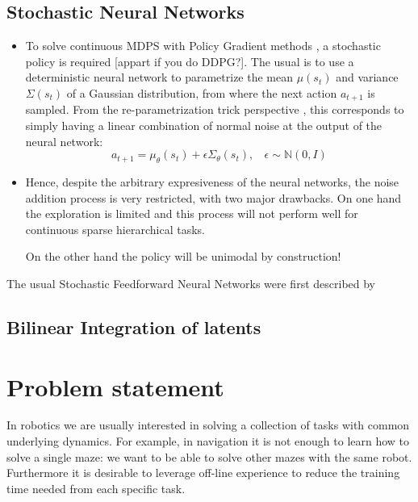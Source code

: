 \documentclass{article} %
\begin{document}
\subsection{Stochastic Neural Networks}

\begin{itemize}
    \item To solve continuous MDPS with Policy Gradient methods \citep{peters2008reinforcement}, a stochastic policy is required [appart if you do DDPG?]. The usual is to use a deterministic neural network to parametrize the mean $\mu(s_t)$ and variance $\Sigma(s_t)$ of a Gaussian distribution, from where the next action $a_{t+1}$ is sampled. From the re-parametrization trick perspective \citep{look at SVG paper or DeepMind-modulate}, this corresponds to simply having a linear combination of normal noise at the output of the neural network:
    \begin{equation}
        a_{t+1} = \mu_{\theta}(s_t) +\epsilon \Sigma_\theta(s_t), ~~~~ \epsilon \sim \mathbb{N}(0,I)
    \end{equation}
    \item Hence, despite the arbitrary expresiveness of the neural networks, the noise addition process is very restricted, with two major drawbacks. On one hand the exploration is limited and this process will not perform well for continuous sparse hierarchical tasks. 
    
    On the other hand the policy will be unimodal by construction!
\end{itemize}
The usual Stochastic Feedforward Neural Networks were first described by \citet{tang2013sfnn}

\subsection{Bilinear Integration of latents}

\section{Problem statement}
In robotics we are usually interested in solving a collection of tasks with common underlying dynamics. For example, in navigation it is not enough to learn how to solve a single maze: we want to be able to solve other mazes with the same robot. Furthermore it is desirable to leverage off-line experience to reduce the training time needed from each specific task. 
\end{document}
